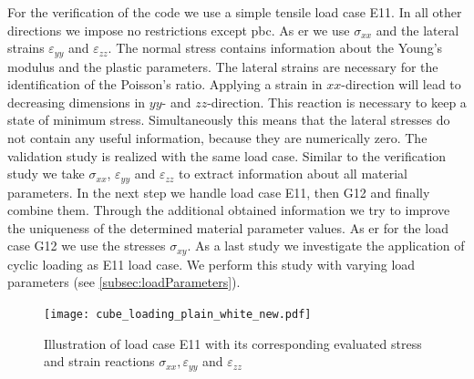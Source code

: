 For the verification of the code we use a simple tensile load case E11.
In all other directions we impose no restrictions except \acrshort{pbc}. As \acrlong{er} we use $\sigma_{xx}$ and the lateral strains $\varepsilon_{yy}$ and $\varepsilon_{zz}$. The normal stress contains information about the Young's modulus and the plastic parameters. The lateral strains are necessary for the identification of the Poisson's ratio. Applying a strain in $xx$-direction will lead to decreasing dimensions in $yy$- and $zz$-direction. This reaction is necessary to keep a state of minimum stress. Simultaneously this means that the lateral stresses do not contain any useful information, because they are numerically zero. 
The validation study is realized with the same load case. Similar to the verification study we take $\sigma_{xx}$,  $\varepsilon_{yy}$ and $\varepsilon_{zz}$ to extract information about all material parameters. 
In the next step we handle load case E11, then G12 and finally combine them. Through the additional obtained information we try to improve the uniqueness of the determined material parameter values. As \acrlong{er} for the load case G12 we use the stresses $\sigma_{xy}$.
As a last study we investigate the application of cyclic loading as E11 load case. We perform this study with varying load parameters (see \autoref{subsec:loadParameters}). 


\begin{figure}[H]
    \centering
    \texttt{[image: cube\_loading\_plain\_white\_new.pdf]}
    \caption{Illustration of load case E11 with its corresponding evaluated stress and strain reactions $\sigma_{xx}, \varepsilon_{yy}$ and $\varepsilon_{zz}$}
    \label{fig:evaluationMeasurements}
\end{figure}

